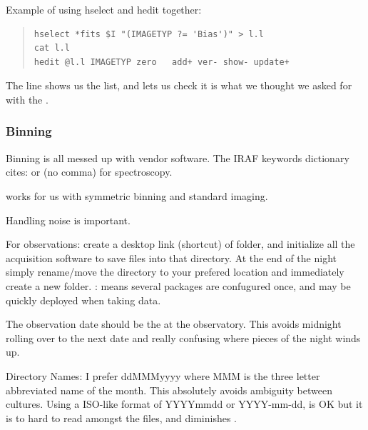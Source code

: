 Example of using hselect and hedit together:

{\color{verbcolor}
\begin{quote}
\begingroup \fontsize{10pt}{10pt}
\selectfont
\begin{verbatim}
hselect *fits $I "(IMAGETYP ?= 'Bias')" > l.l
cat l.l
hedit @l.l IMAGETYP zero   add+ ver- show- update+
\end{verbatim}
\endgroup
\end{quote}
}
The line {\color{verbcolor}{\verb#cat l.l#}} shows us the list,
and lets us check it is what we thought we asked for with the
{\color{verbcolor}{\verb#hselect#}}.

\subsubsection{Binning}

Binning is all messed up with vendor software. The IRAF keywords
dictionary cites: {\color{verbcolor}{\verb#CCSSUM = 2#}} or
{\color{verbcolor}{\verb#CCDSUM = (3 1)#}} (no comma) for
spectroscopy.

\begin{quote}
{\color{verbcolor}{\verb#hedit *fits CCDSUM  "((@'XBINNINB)"#}}
\end{quote}

works for us with symmetric binning and standard imaging.

Handling \gls{noise} is important.




For observations: create a desktop link (shortcut) of
 folder, and initialize all the
acquisition software to save files into that directory. At the end of
the night simply rename/move the directory to your prefered location
and immediately create a new 
folder. : means several packages are confugured once, and may
be quickly deployed when taking data.

The observation date should be the  at the observatory. This
avoids midnight rolling over to the next date and really confusing where
pieces of the night winds up.

Directory Names: I prefer ddMMMyyyy where MMM is the three letter
abbreviated name of the month. This absolutely avoids ambiguity
between cultures. Using a ISO-like format of YYYYmmdd or YYYY-mm-dd,
is OK but it is to hard to read amongst the files, and diminishes
.

